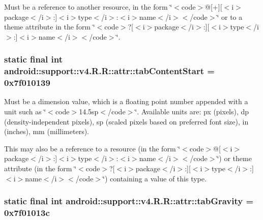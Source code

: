 Must be a reference to another resource, in the form \char`\"{}$<$code$>$@\mbox{[}+\mbox{]}\mbox{[}$<$i$>$package$<$/i$>$:\mbox{]}$<$i$>$type$<$/i$>$:$<$i$>$name$<$/i$>$$<$/code$>$\char`\"{} or to a theme attribute in the form \char`\"{}$<$code$>$?\mbox{[}$<$i$>$package$<$/i$>$:\mbox{]}\mbox{[}$<$i$>$type$<$/i$>$:\mbox{]}$<$i$>$name$<$/i$>$$<$/code$>$\char`\"{}. \hypertarget{classandroid_1_1support_1_1v4_1_1_r_1_1attr_1b24561cfe52c9ee5c3adf2364094147}{
\subsubsection[{tabContentStart}]{\setlength{\rightskip}{0pt plus 5cm}static final int android::support::v4.R.R::attr::tabContentStart = 0x7f010139}}
\label{classandroid_1_1support_1_1v4_1_1_r_1_1attr_1b24561cfe52c9ee5c3adf2364094147}


Must be a dimension value, which is a floating point number appended with a unit such as \char`\"{}$<$code$>$14.5sp$<$/code$>$\char`\"{}. Available units are: px (pixels), dp (density-independent pixels), sp (scaled pixels based on preferred font size), in (inches), mm (millimeters). 

This may also be a reference to a resource (in the form \char`\"{}$<$code$>$@\mbox{[}$<$i$>$package$<$/i$>$:\mbox{]}$<$i$>$type$<$/i$>$:$<$i$>$name$<$/i$>$$<$/code$>$\char`\"{}) or theme attribute (in the form \char`\"{}$<$code$>$?\mbox{[}$<$i$>$package$<$/i$>$:\mbox{]}\mbox{[}$<$i$>$type$<$/i$>$:\mbox{]}$<$i$>$name$<$/i$>$$<$/code$>$\char`\"{}) containing a value of this type. \hypertarget{classandroid_1_1support_1_1v4_1_1_r_1_1attr_4676d130566eff9e8d21cfe178fd2c85}{
\subsubsection[{tabGravity}]{\setlength{\rightskip}{0pt plus 5cm}static final int android::support::v4.R.R::attr::tabGravity = 0x7f01013c}}
\label{classandroid_1_1support_1_1v4_1_1_r_1_1attr_4676d130566eff9e8d21cfe178fd2c85}


